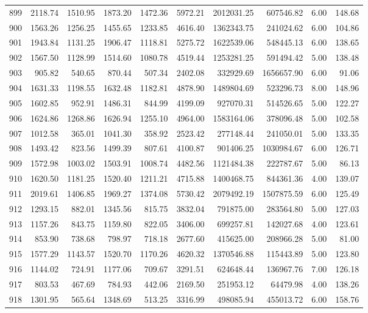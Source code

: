 \begin{tabular}{lrrrrrrrrr}
899 & 2118.74 & 1510.95 & 1873.20 & 1472.36 & 5972.21 & 2012031.25 & 607546.82 & 6.00 & 148.68 \\
900 & 1563.26 & 1256.25 & 1455.65 & 1233.85 & 4616.40 & 1362343.75 & 241024.62 & 6.00 & 104.86 \\
901 & 1943.84 & 1131.25 & 1906.47 & 1118.81 & 5275.72 & 1622539.06 & 548445.13 & 6.00 & 138.65 \\
902 & 1567.50 & 1128.99 & 1514.60 & 1080.78 & 4519.44 & 1253281.25 & 591494.42 & 5.00 & 138.48 \\
903 & 905.82 & 540.65 & 870.44 & 507.34 & 2402.08 & 332929.69 & 1656657.90 & 6.00 & 91.06 \\
904 & 1631.33 & 1198.55 & 1632.48 & 1182.81 & 4878.90 & 1489804.69 & 523296.73 & 8.00 & 148.96 \\
905 & 1602.85 & 952.91 & 1486.31 & 844.99 & 4199.09 & 927070.31 & 514526.65 & 5.00 & 122.27 \\
906 & 1624.86 & 1268.86 & 1626.94 & 1255.10 & 4964.00 & 1583164.06 & 378096.48 & 5.00 & 102.58 \\
907 & 1012.58 & 365.01 & 1041.30 & 358.92 & 2523.42 & 277148.44 & 241050.01 & 5.00 & 133.35 \\
908 & 1493.42 & 823.56 & 1499.39 & 807.61 & 4100.87 & 901406.25 & 1030984.67 & 6.00 & 126.71 \\
909 & 1572.98 & 1003.02 & 1503.91 & 1008.74 & 4482.56 & 1121484.38 & 222787.67 & 5.00 & 86.13 \\
910 & 1620.50 & 1181.25 & 1520.40 & 1211.21 & 4715.88 & 1400468.75 & 844361.36 & 4.00 & 139.07 \\
911 & 2019.61 & 1406.85 & 1969.27 & 1374.08 & 5730.42 & 2079492.19 & 1507875.59 & 6.00 & 125.49 \\
912 & 1293.15 & 882.01 & 1345.56 & 815.75 & 3832.04 & 791875.00 & 283564.80 & 5.00 & 127.03 \\
913 & 1157.26 & 843.75 & 1159.80 & 822.05 & 3406.00 & 699257.81 & 142027.68 & 4.00 & 123.61 \\
914 & 853.90 & 738.68 & 798.97 & 718.18 & 2677.60 & 415625.00 & 208966.28 & 5.00 & 81.00 \\
915 & 1577.29 & 1143.57 & 1520.70 & 1170.26 & 4620.32 & 1370546.88 & 115443.89 & 5.00 & 123.80 \\
916 & 1144.02 & 724.91 & 1177.06 & 709.67 & 3291.51 & 624648.44 & 136967.76 & 7.00 & 126.18 \\
917 & 803.53 & 467.69 & 784.93 & 442.06 & 2169.50 & 251953.12 & 64479.98 & 4.00 & 138.26 \\
918 & 1301.95 & 565.64 & 1348.69 & 513.25 & 3316.99 & 498085.94 & 455013.72 & 6.00 & 158.76 \\

\end{tabular}

